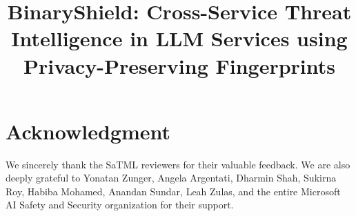 \documentclass[conference]{IEEEtran}
\begin{document}
\title{BinaryShield: Cross-Service Threat Intelligence in LLM Services using Privacy-Preserving Fingerprints}

\author{
  \and
  \and
  
}

\maketitle

\pagestyle{fancy}
\fancyhf{}
\fancyfoot[C]{\thepage}
\renewcommand{\headrulewidth}{0pt}
\renewcommand{\footrulewidth}{0pt}










\section*{Acknowledgment}
We sincerely thank the SaTML reviewers for their valuable feedback. 
We are also deeply grateful to Yonatan Zunger, Angela Argentati, Dharmin Shah, Sukirna Roy, Habiba Mohamed, Anandan Sundar, Leah Zulas, and the entire Microsoft AI Safety and Security organization for their support.














\end{document}
